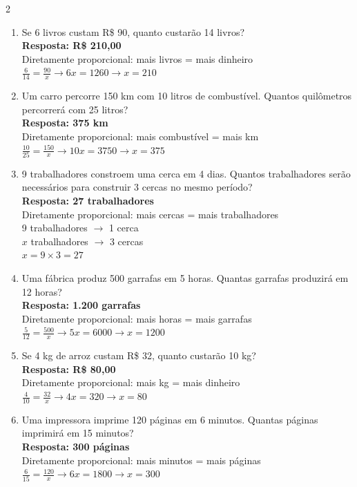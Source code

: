 \documentclass[11pt]{article}
\begin{document}
\begin{multicols}{2}
\begin{enumerate}[leftmargin=*, itemsep=15pt]
\item Se 6 livros custam R\$ 90, quanto custarão 14 livros? \\
\textbf{Resposta: R\$ 210,00} \\
Diretamente proporcional: mais livros = mais dinheiro \\
$\frac{6}{14} = \frac{90}{x} \rightarrow 6x = 1260 \rightarrow x = 210$

\item Um carro percorre 150 km com 10 litros de combustível. Quantos quilômetros percorrerá com 25 litros? \\
\textbf{Resposta: 375 km} \\
Diretamente proporcional: mais combustível = mais km \\
$\frac{10}{25} = \frac{150}{x} \rightarrow 10x = 3750 \rightarrow x = 375$

\item 9 trabalhadores constroem uma cerca em 4 dias. Quantos trabalhadores serão necessários para construir 3 cercas no mesmo período? \\
\textbf{Resposta: 27 trabalhadores} \\
Diretamente proporcional: mais cercas = mais trabalhadores \\
9 trabalhadores $\rightarrow$ 1 cerca \\
$x$ trabalhadores $\rightarrow$ 3 cercas \\
$x = 9 \times 3 = 27$

\item Uma fábrica produz 500 garrafas em 5 horas. Quantas garrafas produzirá em 12 horas? \\
\textbf{Resposta: 1.200 garrafas} \\
Diretamente proporcional: mais horas = mais garrafas \\
$\frac{5}{12} = \frac{500}{x} \rightarrow 5x = 6000 \rightarrow x = 1200$

\item Se 4 kg de arroz custam R\$ 32, quanto custarão 10 kg? \\
\textbf{Resposta: R\$ 80,00} \\
Diretamente proporcional: mais kg = mais dinheiro \\
$\frac{4}{10} = \frac{32}{x} \rightarrow 4x = 320 \rightarrow x = 80$

\item Uma impressora imprime 120 páginas em 6 minutos. Quantas páginas imprimirá em 15 minutos? \\
\textbf{Resposta: 300 páginas} \\
Diretamente proporcional: mais minutos = mais páginas \\
$\frac{6}{15} = \frac{120}{x} \rightarrow 6x = 1800 \rightarrow x = 300$


\end{enumerate}
\end{multicols}
\end{document}

